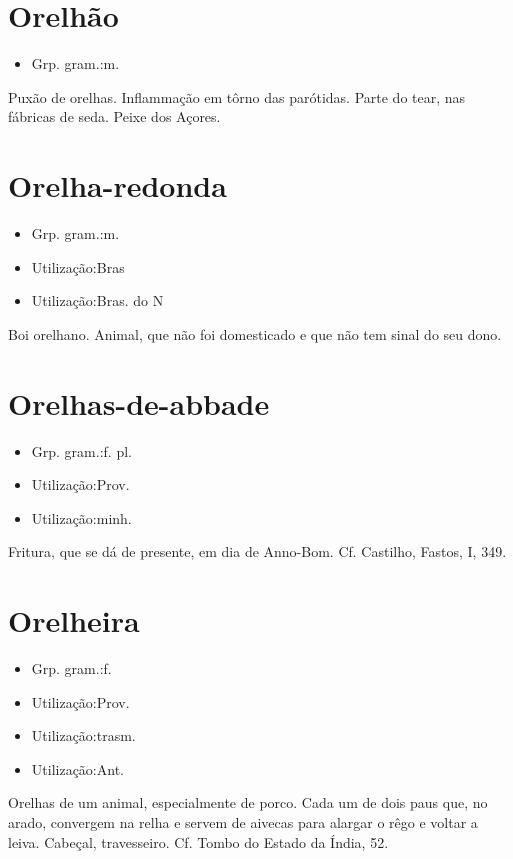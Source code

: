 \section{Orelhão}
\begin{itemize}
\item {Grp. gram.:m.}
\end{itemize}
Puxão de orelhas.
Inflammação em tôrno das parótidas.
Parte do tear, nas fábricas de seda.
Peixe dos Açores.
\section{Orelha-redonda}
\begin{itemize}
\item {Grp. gram.:m.}
\end{itemize}
\begin{itemize}
\item {Utilização:Bras}
\end{itemize}
\begin{itemize}
\item {Utilização:Bras. do N}
\end{itemize}
Boi orelhano.
Animal, que não foi domesticado e que não tem sinal do seu dono.
\section{Orelhas-de-abbade}
\begin{itemize}
\item {Grp. gram.:f. pl.}
\end{itemize}
\begin{itemize}
\item {Utilização:Prov.}
\end{itemize}
\begin{itemize}
\item {Utilização:minh.}
\end{itemize}
Fritura, que se dá de presente, em dia de Anno-Bom. Cf. Castilho, \textunderscore Fastos\textunderscore , I, 349.
\section{Orelheira}
\begin{itemize}
\item {Grp. gram.:f.}
\end{itemize}
\begin{itemize}
\item {Utilização:Prov.}
\end{itemize}
\begin{itemize}
\item {Utilização:trasm.}
\end{itemize}
\begin{itemize}
\item {Utilização:Ant.}
\end{itemize}
Orelhas de um animal, especialmente de porco.
Cada um de dois paus que, no arado, convergem na relha e servem de aivecas para alargar o rêgo e voltar a leiva.
Cabeçal, travesseiro. Cf. \textunderscore Tombo do Estado da Índia\textunderscore , 52.
